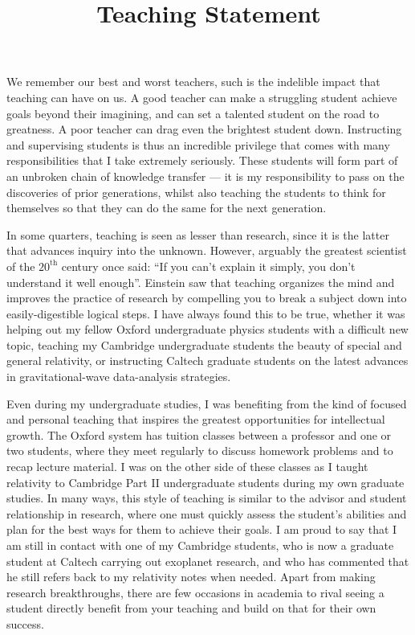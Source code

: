 \documentclass[11pt,letterpaper,sans]{moderncv} %
\title{\huge{Teaching Statement}}
\begin{document}
\makecvtitle %

We remember our best and worst teachers, such is the indelible impact that teaching can have on us. A good teacher can make a struggling student achieve goals beyond their imagining, and can set a talented student on the road to greatness. A poor teacher can drag even the brightest student down. Instructing and supervising students is thus an incredible privilege that comes with many responsibilities that I take extremely seriously. These students will form part of an unbroken chain of knowledge transfer --- it is my responsibility to pass on the discoveries of prior generations, whilst also teaching the students to think for themselves so that they can do the same for the next generation.
\vspace{2mm}

In some quarters, teaching is seen as lesser than research, since it is the latter that advances inquiry into the unknown. However, arguably the greatest scientist of the $20^\mathrm{th}$ century once said: ``If you can't explain it simply, you don't understand it well enough''. Einstein saw that teaching organizes the mind and improves the practice of research by compelling you to break a subject down into easily-digestible logical steps. I have always found this to be true, whether it was helping out my fellow Oxford undergraduate physics students with a difficult new topic, teaching my Cambridge undergraduate students the beauty of special and general relativity, or instructing Caltech graduate students on the latest advances in gravitational-wave data-analysis strategies.
\vspace{2mm}

Even during my undergraduate studies, I was benefiting from the kind of focused and personal teaching that inspires the greatest opportunities for intellectual growth. The Oxford system has tuition classes between a professor and one or two students, where they meet regularly to discuss homework problems and to recap lecture material. I was on the other side of these classes as I taught relativity to Cambridge Part II undergraduate students during my own graduate studies. In many ways, this style of teaching is similar to the advisor and student relationship in research, where one must quickly assess the student's abilities and plan for the best ways for them to achieve their goals. I am proud to say that I am still in contact with one of my Cambridge students, who is now a graduate student at Caltech carrying out exoplanet research, and who has commented that he still refers back to my relativity notes when needed. Apart from making research breakthroughs, there are few occasions in academia to rival seeing a student directly benefit from your teaching and build on that for their own success.
\vspace{2mm}
\end{document}
